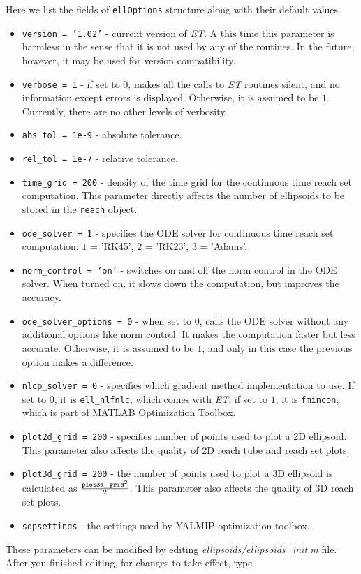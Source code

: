 \documentclass{report}
\begin{document}
Here we list the fields of {\tt ellOptions} structure along with their
default values.
\begin{itemize}
\item {\tt version = '1.02'} - current version of {\it ET}. A this time
this parameter is harmless in the sense that it is not used by any of the
routines. In the future, however, it may be used for version compatibility.
\item {\tt verbose = 1} - if set to $0$, makes all the calls to {\it ET}
routines silent, and no information except errors is displayed. Otherwise,
it is assumed to be $1$. Currently, there are no other levels of verbosity.
\item {\tt abs\_tol = 1e-9} - absolute tolerance.
\item {\tt rel\_tol = 1e-7} - relative tolerance.
\item {\tt time\_grid = 200} - density of the time grid for the
continuous time reach set computation.
This parameter directly affects the number of ellipsoids to
be stored in the {\tt reach} object.
\item {\tt ode\_solver = 1} - specifies the ODE solver for continuous time
reach set computation: $1$ = 'RK45', $2$ = 'RK23', $3$ = 'Adams'.
\item {\tt norm\_control = 'on'} - switches on and off the norm control
in the ODE solver. When turned on, it slows down the computation, but improves
the accuracy.
\item {\tt ode\_solver\_options = 0} - when set to $0$, calls the ODE solver
without any additional options like norm control. It makes the computation
faster but less accurate. Otherwise, it is assumed to be $1$, and only in this
case the previous option makes a difference.
\item {\tt nlcp\_solver = 0} - specifies which gradient method implementation
to use. If set to $0$, it is {\tt ell\_nlfnlc}, which comes with {\it ET};
if set to $1$, it is {\tt fmincon}, which is part of MATLAB Optimization Toolbox.
\item {\tt plot2d\_grid = 200} - specifies number of points used to plot a
2D ellipsoid. This parameter also affects the quality of 2D reach tube
and reach set plots.
\item {\tt plot3d\_grid = 200} - the number of points used to plot
a 3D ellipsoid is calculated as $\frac{{\tt plot3d\_grid}^2}{2}$.
This parameter also affects the quality of 3D reach set plots.
\item {\tt sdpsettings} - the settings used by YALMIP optimization toolbox.
\end{itemize}
These parameters can be modified by editing {\it ellipsoids/ellipsoids\_init.m}
file. After you finished editing, for changes to take effect, type
\end{document}
